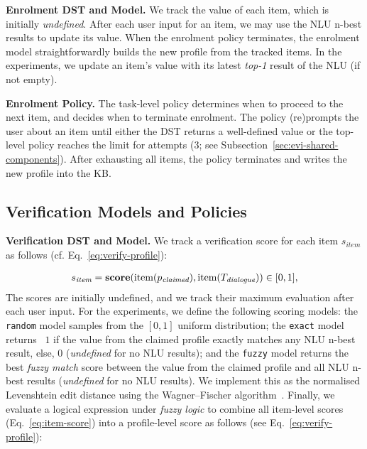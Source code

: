 \documentclass[11pt]{article}
\newcommand{\sparagraph}[1]{\noindent\textbf{#1.}}
\newcommand{\rparagraph}[1]{\vspace{1.4mm}\noindent\textbf{#1.}}
\begin{document}
{\sparagraph{Enrolment DST and Model}
We track the value of each item, which is initially \textit{undefined}.
After each user input for an item,
we may use the NLU n-best results to update its value.
When the enrolment policy terminates,
the enrolment model straightforwardly builds 
the new profile from the tracked items.
In the experiments,
we update an item's value
with its latest \textit{top-1} result of the NLU (if not empty).

\rparagraph{Enrolment Policy}
The task-level policy
determines when to proceed to the next item,
and decides when to terminate enrolment.
The policy
(re)prompts the user about an item
until
either the DST returns a well-defined value or the top-level policy reaches the limit for attempts
($3$; see Subsection~\ref{sec:evi-shared-components}).
After exhausting all items, the policy terminates
and writes the new profile into the KB.



\subsection{Verification Models and Policies}
\label{sec:verification-policy}

\sparagraph{Verification DST and Model}
We track a verification score for each item $s_{item}$ as follows (cf. Eq.~\ref{eq:verify-profile}):

\vspace{-2mm}
{\small
\begin{equation}
\begin{gathered}
s_\textit{item} = \textbf{\textrm{score}}(\textrm{item}(p_\textit{claimed}), \textrm{item}(T_\textit{dialogue}))
\in [0,1],
\end{gathered}
\label{eq:item-score}
\end{equation}}The scores are initially undefined,
and we track their maximum evaluation after each user input.
For the experiments,
we define the following scoring models:
the \texttt{random} model samples from the $[0,1]$ uniform distribution;
the \texttt{exact} model
returns ~$1$ 
if the value from the claimed profile
exactly matches any NLU n-best result, else, $0$ (\textit{undefined} for no NLU results);
and the \texttt{fuzzy} model
returns the best \textit{fuzzy match} score
between the value from the claimed profile
and all NLU n-best results (\textit{undefined} for no NLU results).
We implement this as the normalised Levenshtein edit distance
using the Wagner–Fischer algorithm~\cite{wagner1974string}.
Finally, we evaluate a logical expression under \textit{fuzzy logic}
to combine all item-level scores (Eq.~\ref{eq:item-score})
into a profile-level score as follows (see Eq.~\ref{eq:verify-profile}):

}
\end{document}
